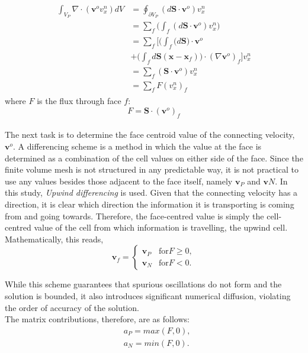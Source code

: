 \documentclass[final,3p,times,twocolumn]{elsarticle}
\begin{document}
\begin{align}
    \begin{split}
        \int_{V_P} \nabla \cdot ( \mathbf{v}^o v_x^n ) dV &= \oint_{\partial V_P} (d\mathbf{S} \cdot \mathbf{v}^o ) v_x^n
        \\
        &= \sum\limits_f \Biggl( \int_f (d\mathbf{S} \cdot \mathbf{v}^o) v_x^n \Biggr)
        \\ 
        &= \sum\limits_f \Biggl[ \biggl( \int_f (d\mathbf{S} \Biggr) \cdot \mathbf{v}^o
        \\
        &+ \Biggl( \int_f d\mathbf{S} (\mathbf{x} - \mathbf{x}_f) \Biggr) \cdot (\nabla \mathbf{v}^o)_f \Biggr]  v_x^n 
        \\
        &= \sum\limits_f (\mathbf{S} \cdot \mathbf{v}^o) v_x^n
        \\
        &= \sum\limits_f F (v_x^n)_f
    \end{split}
\end{align}
where $F$ is the flux through face $f$: $$F = \mathbf{S} \cdot (\mathbf{v}^o)_f$$
\\ 
The next task is to determine the face centroid value of the connecting velocity, $\mathbf{v}^o$. A differencing scheme is a method in which the value at the face is determined as a combination of the cell values on either side of the face. Since the finite volume mesh is not structured in any predictable way, it is not practical to use any values besides those adjacent to the face itself, namely $\mathbf{v}_P$ and $\mathbf{v}N$. In this study, \textit{Upwind differencing} is used. Given that the connecting velocity has a direction, it is clear which direction the information it is transporting is coming from and going towards. Therefore, the face-centred value is simply the cell-centred value of the cell from which information is travelling, the upwind cell. Mathematically, this reads,
\begin{equation}
    \mathbf{v}_f = 
    \begin{cases}
          \mathbf{v}_P & \text{for} F \geq 0 ,\\
          \mathbf{v}_N & \text{for} F < 0 .
    \end{cases}
    \label{eqn:upwind_diff}
\end{equation}

While this scheme guarantees that spurious oscillations do not form and the solution is bounded, it also introduces significant numerical diffusion, violating the order of accuracy of the solution. \\ 
The matrix contributions, therefore, are as follows:
\begin{align}
    \label{eqn:conv_matrix}
    &a_P = max(F , 0) , \\
    &a_N = min(F , 0) .
\end{align}
\end{document}
